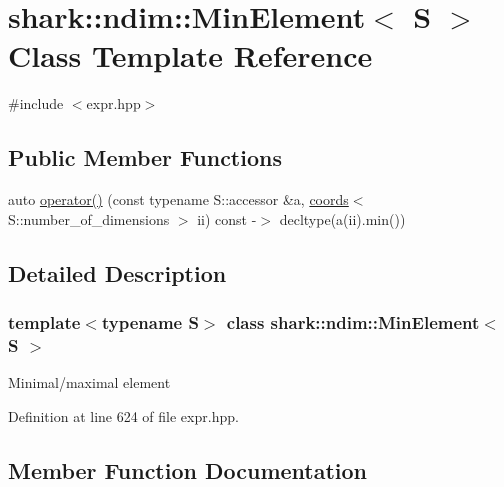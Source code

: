 \hypertarget{classshark_1_1ndim_1_1_min_element}{}\section{shark\+:\+:ndim\+:\+:Min\+Element$<$ S $>$ Class Template Reference}
\label{classshark_1_1ndim_1_1_min_element}


{\ttfamily \#include $<$expr.\+hpp$>$}

\subsection*{Public Member Functions}
\begin{DoxyCompactItemize}
\item 
auto \hyperlink{classshark_1_1ndim_1_1_min_element_a86825d644a64c6ad07cd34e18da611bd}{operator()} (const typename S\+::accessor \&a, \hyperlink{structshark_1_1ndim_1_1coords}{coords}$<$ S\+::number\+\_\+of\+\_\+dimensions $>$ ii) const -\/$>$ decltype(a(ii).min())
\end{DoxyCompactItemize}


\subsection{Detailed Description}
\subsubsection*{template$<$typename S$>$\newline
class shark\+::ndim\+::\+Min\+Element$<$ S $>$}

Minimal/maximal element 

Definition at line 624 of file expr.\+hpp.



\subsection{Member Function Documentation}
\hypertarget{classshark_1_1ndim_1_1_min_element_a86825d644a64c6ad07cd34e18da611bd}{}\label{classshark_1_1ndim_1_1_min_element_a86825d644a64c6ad07cd34e18da611bd} 

